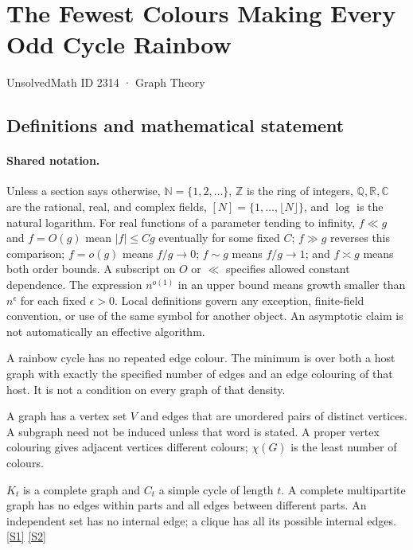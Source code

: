 \documentclass[11pt,a4paper]{article}
\newcommand{\N}{\mathbb{N}}
\newcommand{\Z}{\mathbb{Z}}
\newcommand{\Q}{\mathbb{Q}}
\newcommand{\R}{\mathbb{R}}
\newcommand{\C}{\mathbb{C}}
\newcommand{\sref}[2]{\hyperlink{source:#1:#2}{[S#2]}}
\begin{document}

\setcounter{section}{2313}

\section{The Fewest Colours Making Every Odd Cycle Rainbow}\label{2314}

{\small\sffamily UnsolvedMath ID 2314 · Graph Theory}

\subsection{Definitions and mathematical statement}

\paragraph{Shared notation.}Unless a section says otherwise, $\N=\{1,2,\ldots\}$,
$\Z$ is the ring of integers, $\Q,\R,\C$ are the rational, real, and complex
fields, $[N]=\{1,\ldots,\lfloor N\rfloor\}$, and $\log$ is the natural
logarithm. For real functions of a parameter tending to infinity,
$f\ll g$ and $f=O(g)$ mean $|f|\leq Cg$ eventually for some fixed $C$;
$f\gg g$ reverses this comparison; $f=o(g)$ means $f/g\to0$;
$f\sim g$ means $f/g\to1$; and $f\asymp g$ means both order bounds.
A subscript on $O$ or $\ll$ specifies allowed constant dependence.
The expression $n^{o(1)}$ in an upper bound means growth smaller than
$n^\epsilon$ for each fixed $\epsilon>0$. Local definitions govern any
exception, finite-field convention, or use of the same symbol for another
object. An asymptotic claim is not automatically an effective algorithm.



A rainbow cycle has no repeated edge colour. The minimum is over both a host graph with exactly the specified number of edges and an edge colouring of that host. It is not a condition on every graph of that density.

A graph has a vertex set $V$ and edges that are unordered pairs of distinct vertices. A subgraph need not be induced unless that word is stated. A proper vertex colouring gives adjacent vertices different colours; $\chi(G)$ is the least number of colours.

$K_t$ is a complete graph and $C_t$ a simple cycle of length $t$. A complete multipartite graph has no edges within parts and all edges between different parts. An independent set has no internal edge; a clique has all its possible internal edges. \sref{2314}{1} \sref{2314}{2}
\end{document}
